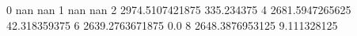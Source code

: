 0 nan nan
1 nan nan
2 2974.5107421875 335.234375
4 2681.5947265625 42.318359375
6 2639.2763671875 0.0
8 2648.3876953125 9.111328125
